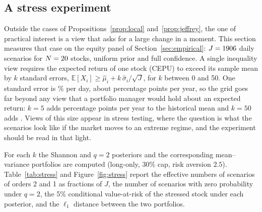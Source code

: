 \documentclass[11pt]{article}
\newcommand{\E}{\mathbb{E}}
\newcommand{\norm}[1]{\left\lVert #1 \right\rVert}
\begin{document}
\subsection{A stress experiment}\label{sec:separation}

Outside the cases of Propositions~\ref{prop:local}
and~\ref{prop:jeffrey}, the one of practical interest is a view that asks
for a large change in a moment. This
section measures that case on the equity panel of
Section~\ref{sec:empirical}: $J = \nJ$ daily scenarios for $N = 20$
stocks, uniform prior and full confidence. A single inequality view
requires the expected return of one stock (CEPU) to exceed its sample mean
by $k$ standard errors,
$\E[X_i] \ge \hat\mu_i + k\,\hat\sigma_i/\sqrt{J}$, for $k$ between 0 and
50. One standard error is \nSEday\% per day, about \nSEann{} percentage
points per year, so the grid goes far beyond any view that a portfolio manager would hold
about an expected return: $k=5$ adds \nExFive{} percentage points per year
to the historical mean and $k=50$ adds \nExFifty. Views of this size appear
in stress testing, where the question is what the scenarios look like if
the market moves to an extreme regime, and the experiment should be read in
that light.

For each $k$ the Shannon and $q=2$ posteriors and the corresponding
mean--variance portfolios are computed (long-only, 30\% cap, risk aversion $2.5$).
Table~\ref{tab:stress} and Figure~\ref{fig:stress} report the effective
numbers of scenarios of orders 2 and 1 as fractions of $J$, the number of
scenarios with zero probability under $q=2$, the 5\% conditional
value-at-risk of the stressed stock under each posterior, and the $\ell_1$
distance between the two portfolios.

\begin{table}[t]
\centering
\footnotesize
\caption{Stress experiment: one inequality view on the expected return of
one stock, $k$ standard errors above its sample mean ($J = \nJ$, uniform
prior, full confidence). $\Delta\mu$ is the corresponding excess over the
historical mean in percentage points per year. $N_2/J$ and $N_1/J$ are the
effective numbers of scenarios of orders 2 (Kish) and 1 (entropy) as
fractions of $J$. EP is the classical (Shannon) posterior. ``Zeros'' is the number of
scenarios with zero probability under $q=2$. CVaR is the 5\% conditional
value-at-risk of the stock, that is, its mean return over the worst 5\% of
probability mass, in per cent per day ($\nCVaRprior$ under the prior).
$\norm{\Delta w}_1$ is the $\ell_1$ distance between the mean--variance
portfolios of the two posteriors. Last row: ranking of the \nN{} stocks in
the reverse order of their sample means.}
\label{tab:stress}

\end{table}
\end{document}
